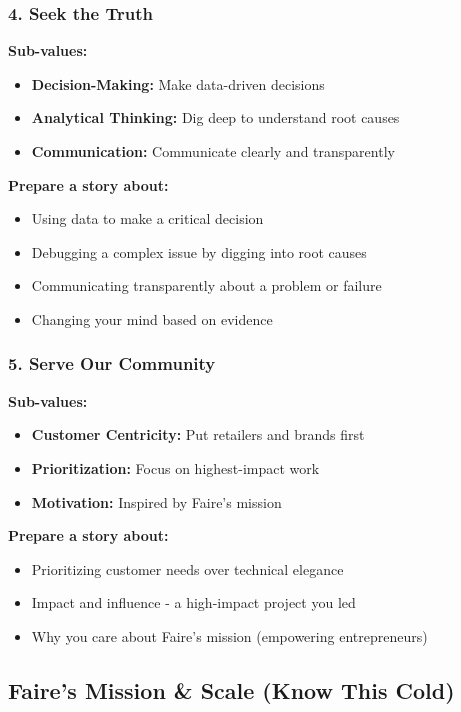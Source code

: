 \documentclass[11pt,letterpaper]{article}
\begin{document}
\subsubsection{4. Seek the Truth}

\textbf{Sub-values:}
\begin{itemize}
    \item \textbf{Decision-Making:} Make data-driven decisions
    \item \textbf{Analytical Thinking:} Dig deep to understand root causes
    \item \textbf{Communication:} Communicate clearly and transparently
\end{itemize}

\textbf{Prepare a story about:}
\begin{itemize}
    \item Using data to make a critical decision
    \item Debugging a complex issue by digging into root causes
    \item Communicating transparently about a problem or failure
    \item Changing your mind based on evidence
\end{itemize}

\subsubsection{5. Serve Our Community}

\textbf{Sub-values:}
\begin{itemize}
    \item \textbf{Customer Centricity:} Put retailers and brands first
    \item \textbf{Prioritization:} Focus on highest-impact work
    \item \textbf{Motivation:} Inspired by Faire's mission
\end{itemize}

\textbf{Prepare a story about:}
\begin{itemize}
    \item Prioritizing customer needs over technical elegance
    \item Impact and influence - a high-impact project you led
    \item Why you care about Faire's mission (empowering entrepreneurs)
\end{itemize}

\subsection{Faire's Mission \& Scale (Know This Cold)}
\end{document}
